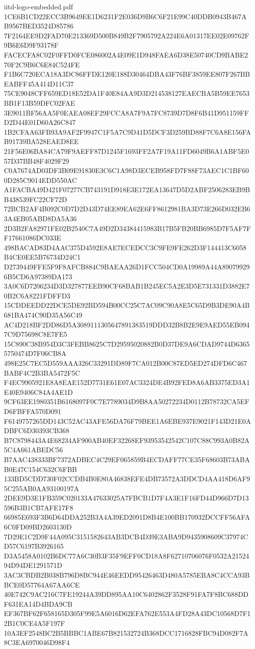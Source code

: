\begin{filecontents*}[overwrite]{iitd-logo-embedded.pdf}
1CE6B1CD22ECC3B9649EE1D6231F2E036D9B6C6F21E99C40DDB0943B467AB9567BED3524D85786
7F2164EE9D2FAD70E213369D500B849B2F7905792A224E6A01317EE02E09762F9B6E6D9F93178F
FACECFA8C02F0FFD0FCE086002A4E09E1D948FAEA6D38E50740CD9BABE270F2C9B6C6E84C524FE
F1B6C720ECA18A3DC86FFDE120E188D30464DBA43F76BF3859EE807F267BBEABFF45A414D11C37
75CE9048CFF659ED18E52DA1F40E84AA9D3D214538127EAECBA5B59EE7653BB1F13B59DFC02FAE
3E9011BF56AA5F0EAEA08EF29FCCA8A7F9A7FC8739D7D8F6B41D951159FFD2D44E01D60A26C847
1B2CFAA63FB93A9AF2F9947C1F5A7C9D41D5DCF3D259BD88F7C6A8E156FAB91739BA528EAED8EE
21F56E06BA84CA79F9AEFF87D1245F1693FF2A7F19A11FD6049B6A1ABF5E057D37BB48F4029F29
C0A7674AD03DF3B09E91830E3C6C1A98D3ECEB958FD7F88F73AEC1C1BF600D285C9014EDD550AC
A1FACBA49D421F07277CB743191D918E3E172EA13647D5D2ABF2506283EB9BB438539FC22CF72D
72BCB2AF4B092C0D7D2D43D74EE89EA62E6FF8612981BA3D73E266D032EB63A4EB05ABD8DA5A36
2D3B2FA82971FE02B2540C7A49D2D34384415983B17B5FB20BB6985D7F5AF7FF17661086DC033E
498BACAD83D4AAC375D4592E8AE7ECEDCC3C9FE9FE262D3F144413C6058B4CE0EE5B76734D24C1
D2739449FFE5F9F8AFCB884C9BAEAA26D1FCC504CD0A19989A44A890799296B5CD6A97389DA173
3A0C6D7206234D3D327877EEB90CF68BAB1B245EC5A2E3D5E731331D3882E70B2C6A8221FDFFD3
15CDDEEDD22DCE5DE92BD594B00CC25C7AC09C90A8E5C65D9B3DE90A4B681BA474C90D35A56C49
AC4D218BF2DD86D5A3089111305647891383519DDD32B8B2E9E9AED55EB0947C9D75698C8E7FE5
15C890C38B954D3C3FEBB8625C7D29595020882B0D37DE9A6CDAD9744D63655750474D7F06CB8A
498E25C7EC5D559AAA326C33291DD89F7CA012B00C87ED5ED274DFD6C467BABF4C2B3BA5472F5C
F4EC9905921E8A8EAE152D7731E61E07AC3324DE4B92FED8A6AB3375ED3A1E40E9406C84A4AE1D
9CF63EE1980351B6168097F0C7E7789034D9B8AA50272234D0112B78732CA5EFD6FBFFA570D091
F6149757265DD143C52AC43AFE56DA76F79BEE1A6EBE937E9021F143D21E0ADBFC6D30393CB368
B7C8798443A4E68234AF900AB40EF32268EF93953542542C107C88C993A0B82A5C4A661ABEDC56
B7AAC438333BF7372ADBEC4C29EF065859B4ECDAFF77CE35F68603B73ABAB0E47C154C632C6FBB
133BD5CDD730F02CCDB4B0E80A46838EFE4DB73572A3DDCD4AA418D6AF95C255AB0AA93100197A
2DEE9D3E1FB359C020133A47633025A7FBCB1D7F4A3E1F16FD44D966D7D13596B3B1CB7AFE17F8
66985E693F3B6D64DDA252B3A4A39ED2091D8B4E100BB170932DCCFF56AFA6C0FD09BD2603130D
7D29E1C2D9F44A095C3151582643AB3DCB4D39E3ABA9D9435908609C37974CD57C6197B3926165
D3A5458A0102B6DC77A6C30B3F35F9EFF0CD18A8F62710706076F0532A2152494D94DE1291571D
3AC3CBDB2B038B796D8BC944E46EEDD95426463D480A5785EBA8C4CCA93BBCE0D57764A67AA6CE
40E742C9AC216C7FE19244A39DD895AA10C6402862F3528F91FA7F8BC688DDF631EA14D4BDA9CB
EF367BF62F658165D305F99E5A6016D62EFA762E553A4FD28A43DC10568D7F12B1C0CE4A5F197F
10A3EF2548BC2B5BBBC1ABE67B821532724B368DCC1716828FBC94D082F7A8C3EA6970046D98F4

\end{filecontents*}
